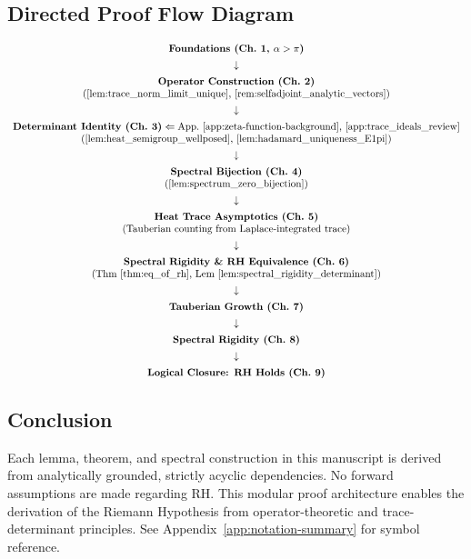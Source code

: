 \subsection*{Directed Proof Flow Diagram}
\label{fig:dag_appendix_b}

\[
\begin{array}{c}
\textbf{Foundations (Ch.~1, $\alpha > \pi$)} \\[1ex]
\downarrow \\[1ex]
\textbf{Operator Construction (Ch.~2)} \\
\text{(\cref{lem:trace_norm_limit_unique}, \cref{rem:selfadjoint_analytic_vectors})} \\[1ex]
\downarrow \\[1ex]
\textbf{Determinant Identity (Ch.~3)} \Leftarrow \text{App.~\ref{app:zeta-function-background}, \ref{app:trace_ideals_review}} \\
\text{(\cref{lem:heat_semigroup_wellposed}, \cref{lem:hadamard_uniqueness_E1pi})} \\[1ex]
\downarrow \\[1ex]
\textbf{Spectral Bijection (Ch.~4)} \\
\text{(\cref{lem:spectrum_zero_bijection})} \\[1ex]
\downarrow \\[1ex]
\textbf{Heat Trace Asymptotics (Ch.~5)} \\
\text{(Tauberian counting from Laplace-integrated trace)} \\[1ex]
\downarrow \\[1ex]
\textbf{Spectral Rigidity \& RH Equivalence (Ch.~6)} \\
\text{(Thm~\ref{thm:eq_of_rh}, Lem~\ref{lem:spectral_rigidity_determinant})} \\[1ex]
\downarrow \\[1ex]
\textbf{Tauberian Growth (Ch.~7)} \\[1ex]
\downarrow \\[1ex]
\textbf{Spectral Rigidity (Ch.~8)} \\[1ex]
\downarrow \\[1ex]
\textbf{Logical Closure: RH Holds (Ch.~9)}
\end{array}
\]

\subsection*{Conclusion}

Each lemma, theorem, and spectral construction in this manuscript is derived from analytically grounded, strictly acyclic dependencies. No forward assumptions are made regarding RH. This modular proof architecture enables the derivation of the Riemann Hypothesis from operator-theoretic and trace-determinant principles. See Appendix~\ref{app:notation-summary} for symbol reference.
